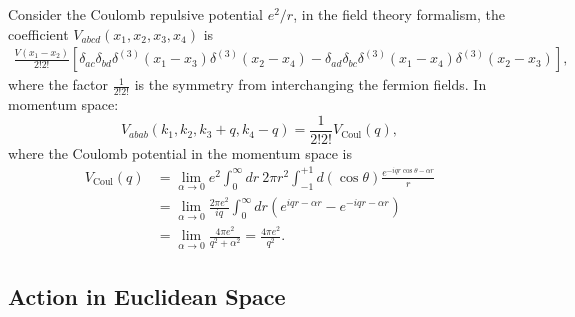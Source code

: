Consider the Coulomb repulsive potential $e^2/r$, in the field theory formalism, the coefficient $V_{abcd}(x_1,x_2,x_3,x_4)$ is
\begin{equation}
\begin{aligned}
	\frac{V(x_1-x_2)}{2!2!}\left[\delta_{ac}\delta_{bd}\delta^{(3)}(x_1-x_3)\delta^{(3)}(x_2-x_4) - \delta_{ad}\delta_{bc}\delta^{(3)}(x_1-x_4)\delta^{(3)}(x_2-x_3)\right],
\end{aligned}
\end{equation}
where the factor $\frac{1}{2!2!}$ is the symmetry from interchanging the fermion fields.
In momentum space:
\begin{equation}
	V_{abab}(k_1,k_2,k_3+q,k_4-q) = \frac{1}{2!2!} V_{\mathrm{Coul}}(q),
\end{equation}
where the Coulomb potential in the momentum space is
\begin{equation}
\begin{aligned}
	V_{\mathrm{Coul}}(q) 
	&=  \lim_{\alpha\rightarrow0}e^{2}\int_{0}^{\infty}dr\ 2\pi r^{2} \int_{-1}^{+1}d\left(\cos\theta\right)\frac{e^{-iqr\cos\theta-\alpha r}}{r} \\
	&=  \lim_{\alpha\rightarrow0}\frac{2\pi e^{2}}{iq}\int_{0}^{\infty}dr\left(e^{iqr-\alpha r}-e^{-iqr-\alpha r}\right)\\
 	&=  \lim_{\alpha\rightarrow0}\frac{4\pi e^{2}}{q^{2}+\alpha^{2}}
	=  \frac{4\pi e^{2}}{q^{2}}.
\end{aligned}
\end{equation}



\subsection{Action in Euclidean Space}

